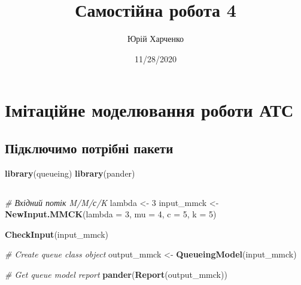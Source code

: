 \documentclass[
]{article}
\title{Самостійна робота 4}
\author{Юрій Харченко}
\date{11/28/2020}
\newenvironment{Shaded}{\begin{snugshade}}{\end{snugshade}}
\newcommand{\CommentTok}[1]{\textcolor[rgb]{0.56,0.35,0.01}{\textit{#1}}}
\newcommand{\DataTypeTok}[1]{\textcolor[rgb]{0.13,0.29,0.53}{#1}}
\newcommand{\DecValTok}[1]{\textcolor[rgb]{0.00,0.00,0.81}{#1}}
\newcommand{\KeywordTok}[1]{\textcolor[rgb]{0.13,0.29,0.53}{\textbf{#1}}}
\newcommand{\NormalTok}[1]{#1}
\newcommand{\StringTok}[1]{\textcolor[rgb]{0.31,0.60,0.02}{#1}}
\begin{document}
\maketitle

\hypertarget{ux456ux43cux456ux442ux430ux446ux456ux439ux43dux435-ux43cux43eux434ux435ux43bux44eux432ux430ux43dux43dux44f-ux440ux43eux431ux43eux442ux438-ux430ux442ux441}{%
\section{Імітаційне моделювання роботи
АТС}\label{ux456ux43cux456ux442ux430ux446ux456ux439ux43dux435-ux43cux43eux434ux435ux43bux44eux432ux430ux43dux43dux44f-ux440ux43eux431ux43eux442ux438-ux430ux442ux441}}

\hypertarget{ux43fux456ux434ux43aux43bux44eux447ux438ux43cux43e-ux43fux43eux442ux440ux456ux431ux43dux456-ux43fux430ux43aux435ux442ux438}{%
\subsection{Підключимо потрібні
пакети}\label{ux43fux456ux434ux43aux43bux44eux447ux438ux43cux43e-ux43fux43eux442ux440ux456ux431ux43dux456-ux43fux430ux43aux435ux442ux438}}

\begin{Shaded}
\begin{Highlighting}[]
\KeywordTok{library}\NormalTok{(queueing)}
\KeywordTok{library}\NormalTok{(pander)}
\end{Highlighting}
\end{Shaded}

\hypertarget{section}{%
\subsection{}\label{section}}

\begin{Shaded}
\begin{Highlighting}[]
\CommentTok{# Вхідний потік M/M/с/K}
\NormalTok{lambda <-}\StringTok{ }\DecValTok{3}
\NormalTok{input_mmck <-}\StringTok{ }\KeywordTok{NewInput.MMCK}\NormalTok{(}\DataTypeTok{lambda =} \DecValTok{3}\NormalTok{, }\DataTypeTok{mu =} \DecValTok{4}\NormalTok{, }\DataTypeTok{c =} \DecValTok{5}\NormalTok{, }\DataTypeTok{k =} \DecValTok{5}\NormalTok{)}

\KeywordTok{CheckInput}\NormalTok{(input_mmck)}

\CommentTok{# Create queue class object}
\NormalTok{output_mmck <-}\StringTok{ }\KeywordTok{QueueingModel}\NormalTok{(input_mmck)}

\CommentTok{# Get queue model report}
\KeywordTok{pander}\NormalTok{(}\KeywordTok{Report}\NormalTok{(output_mmck))}
\end{Highlighting}
\end{Shaded}
\end{document}
